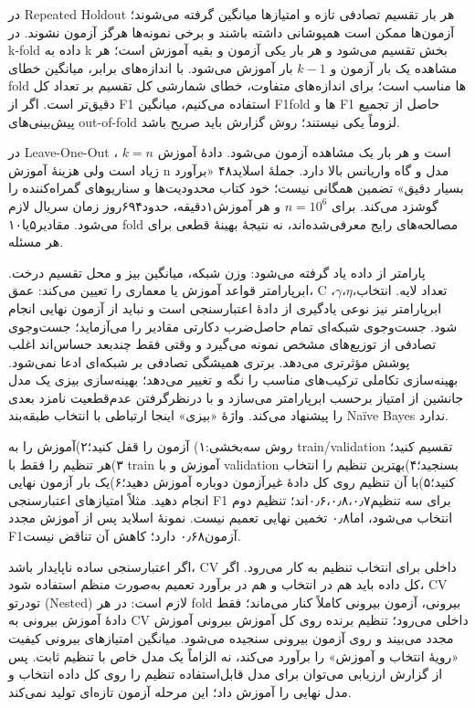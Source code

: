\documentclass[12pt,a4paper,oneside]{report}
\begin{document}
در Repeated Holdout هر بار تقسیم تصادفی تازه و امتیازها میانگین گرفته می‌شوند؛ آزمون‌ها ممکن است همپوشانی داشته باشند و برخی نمونه‌ها هرگز آزمون نشوند. در k-fold داده به k بخش تقسیم می‌شود و هر بار یکی آزمون و بقیه آموزش است؛ هر مشاهده یک بار آزمون و $k-1$ بار آموزش می‌شود. با اندازه‌های برابر، میانگین خطای fold ها مناسب است؛ برای اندازه‌های متفاوت، خطای شمارشی کل تقسیم بر تعداد کل دقیق‌تر است. اگر از F1 استفاده می‌کنیم، میانگین F1fold ها و F1 حاصل از تجمیع پیش‌بینی‌های out-of-fold لزوماً یکی نیستند؛ روش گزارش باید صریح باشد.

در Leave-One-Out ، $k=n$ است و هر بار یک مشاهده آزمون می‌شود. دادهٔ آموزش زیاد است ولی هزینهٔ آموزش n مدل و گاه واریانس بالا دارد. جملهٔ اسلاید۴۸ «برآورد بسیار دقیق» تضمین همگانی نیست؛ خود کتاب محدودیت‌ها و سناریوهای گمراه‌کننده را گوشزد می‌کند. برای $n=10^6$ و هر آموزش۱دقیقه، حدود۶۹۴روز زمان سریال لازم می‌شود. مقادیر۵یا۱۰ fold مصالحه‌های رایج معرفی‌شده‌اند، نه نتیجهٔ بهینهٔ قطعی برای هر مسئله.

پارامتر از داده یاد گرفته می‌شود: وزن شبکه، میانگین بیز و محل تقسیم درخت. ابرپارامتر قواعد آموزش یا معماری را تعیین می‌کند: عمق، C ،$\gamma$،$\eta$،تعداد لایه. انتخاب ابرپارامتر نیز نوعی یادگیری از دادهٔ اعتبارسنجی است و نباید از آزمون نهایی انجام شود. جست‌وجوی شبکه‌ای تمام حاصل‌ضرب دکارتی مقادیر را می‌آزماید؛ جست‌وجوی تصادفی از توزیع‌های مشخص نمونه می‌گیرد و وقتی فقط چندبعد حساس‌اند اغلب پوشش مؤثرتری می‌دهد. برتری همیشگی تصادفی بر شبکه‌ای ادعا نمی‌شود. بهینه‌سازی تکاملی ترکیب‌های مناسب را نگه و تغییر می‌دهد؛ بهینه‌سازی بیزی یک مدل جانشین از امتیاز برحسب ابرپارامتر می‌سازد و با درنظرگرفتن عدم‌قطعیت نامزد بعدی را پیشنهاد می‌کند. واژهٔ «بیزی» اینجا ارتباطی با انتخاب طبقه‌بند Naïve Bayes ندارد.

روش سه‌بخشی:۱) آزمون را قفل کنید؛۲)آموزش را به train/validation تقسیم کنید؛۳)هر تنظیم را فقط با train آموزش و با validation بسنجید؛۴)بهترین تنظیم را انتخاب کنید؛۵)با آن تنظیم روی کل دادهٔ غیرآزمون دوباره آموزش دهید؛۶)یک بار آزمون نهایی انجام دهید. مثلاً امتیازهای اعتبارسنجی F1 برای سه تنظیم۰٫۶،۰٫۸،۰٫۷‌اند؛ تنظیم دوم انتخاب می‌شود، اما۰٫۸ تخمین نهایی تعمیم نیست. نمونهٔ اسلاید پس از آموزش مجدد F1آزمون۰٫۶۸ دارد؛ کاهش آن تناقض نیست.

اگر اعتبارسنجی ساده ناپایدار باشد، CV داخلی برای انتخاب تنظیم به کار می‌رود. اگر کل داده باید هم در انتخاب و هم در برآورد تعمیم به‌صورت منظم استفاده شود، CV تودرتو (Nested) لازم است: در هر fold بیرونی، آزمون بیرونی کاملاً کنار می‌ماند؛ فقط دادهٔ آموزش بیرونی به CV داخلی می‌رود؛ تنظیم برنده روی کل آموزش بیرونی آموزش مجدد می‌بیند و روی آزمون بیرونی سنجیده می‌شود. میانگین امتیازهای بیرونی کیفیت «رویهٔ انتخاب و آموزش» را برآورد می‌کند، نه الزاماً یک مدل خاص با تنظیم ثابت. پس از گزارش ارزیابی می‌توان برای مدل قابل‌استفاده تنظیم را روی کل داده انتخاب و مدل نهایی را آموزش داد؛ این مرحله آزمون تازه‌ای تولید نمی‌کند.
\end{document}
